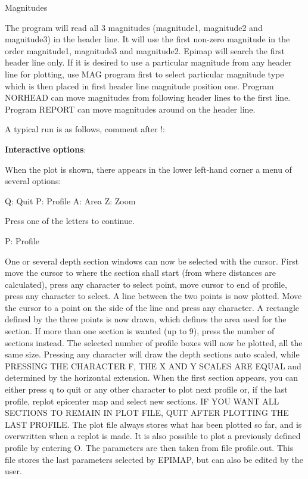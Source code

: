 Magnitudes 

The program will read all 3 magnitudes (magnitude1, magnitude2 and magnitude3) in the header line. It will use the first non-zero magnitude in the order magnitude1, magnitude3 and magnitude2. Epimap will search the first header line only. If it is desired to use a particular magnitude from any header line for plotting, use MAG program first to select particular magnitude type which is then placed in first header line magnitude position one. Program NORHEAD can move magnitudes from following header lines to the first line. Program REPORT can move magnitudes around on the header line. 

A typical run is as follows, comment after !: 



\textbf{Interactive options}: 

When the plot is shown, there appears in the lower left-hand corner a menu of several options: 

Q: Quit \newline
P: Profile \newline
A: Area \newline
Z: Zoom 

Press one of the letters to continue. 

P: Profile 

One or several depth section windows can now be selected with the cursor. First move the cursor to where the section shall start (from where distances are calculated), press any character to select point, move cursor to end of profile, press any character to select. A line between the two points is now plotted. Move the cursor to a point on the side of the line and press any character. A rectangle defined by the three points is now drawn, which defines the area used for the section. If more than one section is wanted (up to 9), press the number of sections instead. The selected number of profile boxes will now be plotted, all the same size.  Pressing any character will draw the depth sections auto scaled, while PRESSING THE CHARACTER F, THE X AND Y SCALES ARE EQUAL and determined by the horizontal extension. When the first section appears, you can either press q to quit or any other character to plot next profile or, if the last profile, replot epicenter map and select new sections. IF YOU WANT ALL SECTIONS TO REMAIN IN PLOT FILE, QUIT AFTER PLOTTING THE LAST PROFILE. The plot file always stores what has been plotted so far, and is overwritten when a replot is made. It is also possible to plot a previously defined profile by entering O. The parameters are then taken from file profile.out. This file stores the last parameters selected by EPIMAP, but can also be edited by the user. 

